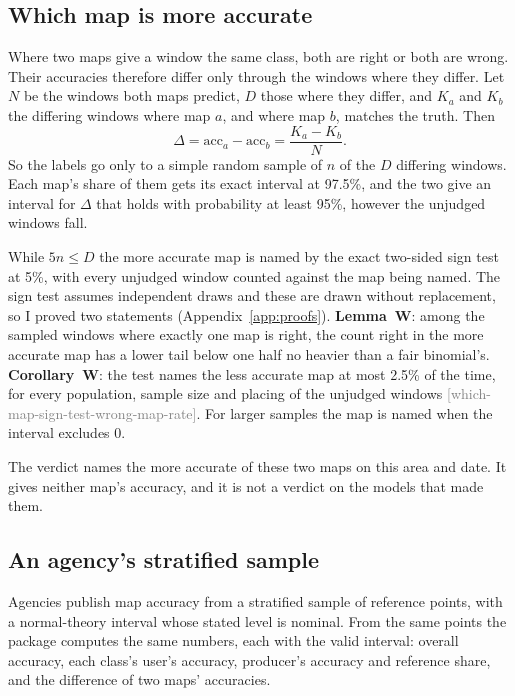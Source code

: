 \documentclass[11pt,a4paper]{article}
\newcommand{\claim}[1]{{\scriptsize\textsf{\textcolor{gray}{[#1]}}}}
\begin{document}
\subsection{Which map is more accurate}
\label{sec:whichmap}

Where two maps give a window the same class, both are right or both are wrong. Their accuracies therefore differ
only through the windows where they differ. Let $N$ be the windows both maps predict, $D$ those where they differ,
and $K_a$ and $K_b$ the differing windows where map $a$, and where map $b$, matches the truth. Then
\begin{equation}
  \Delta = \mathrm{acc}_a - \mathrm{acc}_b = \frac{K_a - K_b}{N}.
\end{equation}
So the labels go only to a simple random sample of $n$ of the $D$ differing windows. Each map's share of them gets
its exact interval at 97.5\%, and the two give an interval for $\Delta$ that holds with probability at least 95\%,
however the unjudged windows fall.

While $5n \le D$ the more accurate map is named by the exact two-sided sign test at 5\%, with every unjudged window
counted against the map being named. The sign test assumes independent draws and these are drawn without
replacement, so I proved two statements (Appendix~\ref{app:proofs}). \textbf{Lemma~W}: among the sampled windows where
exactly one map is right, the count right in the more accurate map has a lower tail below one half no heavier than
a fair binomial's. \textbf{Corollary~W}: the test names the less accurate map at most 2.5\% of the time, for every
population, sample size and placing of the unjudged windows \claim{which-map-sign-test-wrong-map-rate}. For larger
samples the map is named when the interval excludes 0.

The verdict names the more accurate of these two maps on this area and date. It gives neither map's accuracy, and it
is not a verdict on the models that made them.

\subsection{An agency's stratified sample}
\label{sec:agency}

Agencies publish map accuracy from a stratified sample of reference points, with a normal-theory interval
\citep{stehman2014,olofsson2014} whose stated level is nominal. From the same points the package computes the same
numbers, each with the valid interval: overall accuracy, each class's user's accuracy, producer's accuracy and
reference share, and the difference of two maps' accuracies.
\end{document}
